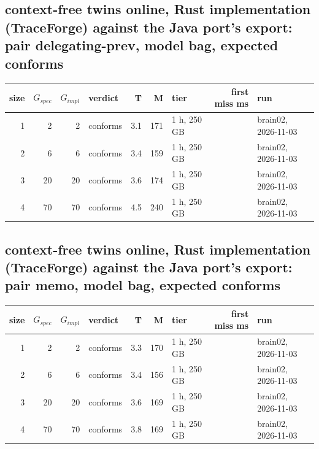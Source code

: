 \documentclass[10pt]{article}
\begin{document}
\subsection*{context-free twins online, Rust implementation (TraceForge) against the Java port's export: pair \textsf{delegating-prev}, model bag, expected conforms}
\begin{longtable}{@{}rrrlrrlrl@{}}
\toprule
size & $G_{\mathit{spec}}$ & $G_{\mathit{impl}}$ & verdict & T & M & tier & first miss ms & run \\
\midrule
\endhead
\color{red} 1 & 2 & 2 & conforms & 3.1 & 171 & 1 h, 250 GB &  & brain02, 2026-11-03 \\
\color{red} 2 & 6 & 6 & conforms & 3.4 & 159 & 1 h, 250 GB &  & brain02, 2026-11-03 \\
\color{red} 3 & 20 & 20 & conforms & 3.6 & 174 & 1 h, 250 GB &  & brain02, 2026-11-03 \\
\color{red} 4 & 70 & 70 & conforms & 4.5 & 240 & 1 h, 250 GB &  & brain02, 2026-11-03 \\
\bottomrule
\end{longtable}
\subsection*{context-free twins online, Rust implementation (TraceForge) against the Java port's export: pair \textsf{memo}, model bag, expected conforms}
\begin{longtable}{@{}rrrlrrlrl@{}}
\toprule
size & $G_{\mathit{spec}}$ & $G_{\mathit{impl}}$ & verdict & T & M & tier & first miss ms & run \\
\midrule
\endhead
\color{red} 1 & 2 & 2 & conforms & 3.3 & 170 & 1 h, 250 GB &  & brain02, 2026-11-03 \\
\color{red} 2 & 6 & 6 & conforms & 3.4 & 156 & 1 h, 250 GB &  & brain02, 2026-11-03 \\
\color{red} 3 & 20 & 20 & conforms & 3.6 & 169 & 1 h, 250 GB &  & brain02, 2026-11-03 \\
\color{red} 4 & 70 & 70 & conforms & 3.8 & 169 & 1 h, 250 GB &  & brain02, 2026-11-03 \\
\bottomrule
\end{longtable}
\end{document}

